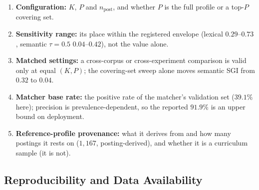 \documentclass[journal]{IEEEtran}
\begin{document}
\begin{enumerate}

\item \textbf{Configuration:} $K$, $P$ and $n_{\text{post}}$, and whether $P$ is the full profile or a top-$P$ covering set.

\item \textbf{Sensitivity range:} its place within the registered envelope (lexical $0.29$--$0.73$, semantic $\tau = 0.5$ $0.04$--$0.42$), not the value alone.

\item \textbf{Matched settings:} a cross-corpus or cross-experiment comparison is valid only at equal $(K, P)$; the covering-set sweep alone moves semantic SGI from $0.32$ to $0.04$.

\item \textbf{Matcher base rate:} the positive rate of the matcher's validation set ($39.1\%$ here); precision is prevalence-dependent, so the reported $91.9\%$ is an upper bound on deployment.

\item \textbf{Reference-profile provenance:} what it derives from and how many postings it rests on ($1{,}167$, posting-derived), and whether it is a curriculum sample (it is not).

\end{enumerate}

\subsection{Reproducibility and Data Availability}
\label{sec:reproducibility}
\end{document}
